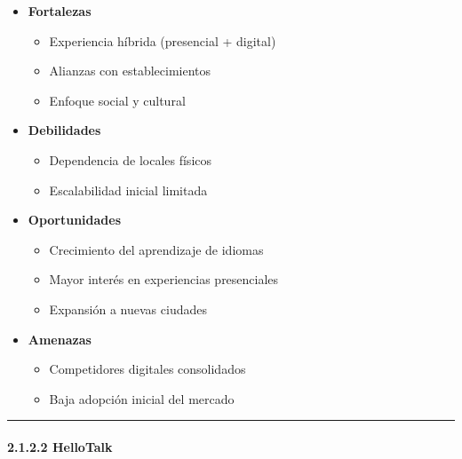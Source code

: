 \begin{itemize}
\tightlist
\item
  \textbf{Fortalezas}

  \begin{itemize}
  \tightlist
  \item
    Experiencia híbrida (presencial + digital)
  \item
    Alianzas con establecimientos
  \item
    Enfoque social y cultural
  \end{itemize}
\item
  \textbf{Debilidades}

  \begin{itemize}
  \tightlist
  \item
    Dependencia de locales físicos
  \item
    Escalabilidad inicial limitada
  \end{itemize}
\item
  \textbf{Oportunidades}

  \begin{itemize}
  \tightlist
  \item
    Crecimiento del aprendizaje de idiomas
  \item
    Mayor interés en experiencias presenciales
  \item
    Expansión a nuevas ciudades
  \end{itemize}
\item
  \textbf{Amenazas}

  \begin{itemize}
  \tightlist
  \item
    Competidores digitales consolidados
  \item
    Baja adopción inicial del mercado
  \end{itemize}
\end{itemize}

\begin{center}\rule{0.5\linewidth}{0.5pt}\end{center}

\paragraph{2.1.2.2
HelloTalk}\label{report__20-cap2-requirements-analysis.md__hellotalk}

